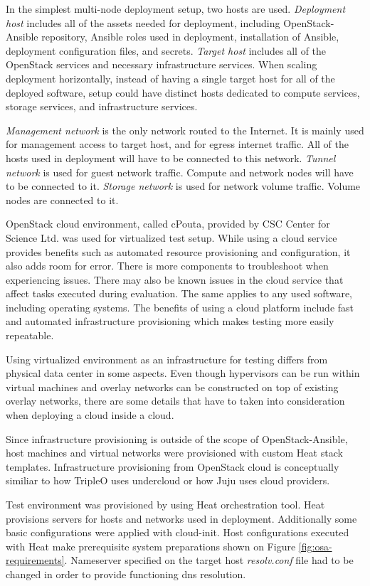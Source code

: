 \documentclass[officiallayout]{tktla}
\begin{document}
In the simplest multi-node deployment setup, two hosts are used.
\textit{Deployment host} includes all of the assets needed for deployment,
including OpenStack-Ansible repository, Ansible roles used in deployment,
installation of Ansible, deployment configuration files, and secrets.
\textit{Target host} includes all of the OpenStack services and necessary
infrastructure services. When scaling deployment horizontally, instead of
having a single target host for all of the deployed software, setup could have
distinct hosts dedicated to compute services, storage services, and
infrastructure services.

\textit{Management network} is the only network routed to the Internet. It is
mainly used for management access to target host, and for egress internet
traffic. All of the hosts used in deployment will have to be connected to this
network. \textit{Tunnel network} is used for guest network traffic. Compute and
network nodes will have to be connected to it. \textit{Storage network} is used
for network volume traffic. Volume nodes are connected to it.

OpenStack cloud environment, called cPouta, provided by CSC Center for Science
Ltd. was used for virtualized test setup. While using a cloud service provides
benefits such as automated resource provisioning and configuration, it also
adds room for error. There is more components to troubleshoot when experiencing
issues. There may also be known issues in the cloud service that affect tasks
executed during evaluation. The same applies to any used software, including
operating systems. The benefits of using a cloud platform include fast and
automated infrastructure provisioning which makes testing more easily
repeatable.

Using virtualized environment as an infrastructure for testing differs from
physical data center in some aspects. Even though hypervisors can be run within
virtual machines and overlay networks can be constructed on top of existing
overlay networks, there are some details that have to taken into consideration
when deploying a cloud inside a cloud.

Since infrastructure provisioning is outside of the scope of OpenStack-Ansible,
host machines and virtual networks were provisioned with custom Heat stack
templates. Infrastructure provisioning from OpenStack cloud is conceptually
similiar to how TripleO uses undercloud or how Juju uses cloud providers.

Test environment was provisioned by using Heat orchestration tool. Heat
provisions servers for hosts and networks used in deployment. Additionally some
basic configurations were applied with cloud-init. Host configurations executed
with Heat make prerequisite system preparations shown on Figure
\ref{fig:osa-requirements}. Nameserver specified on the target host
\textit{resolv.conf} file had to be changed in order to provide functioning dns
resolution.
\end{document}
